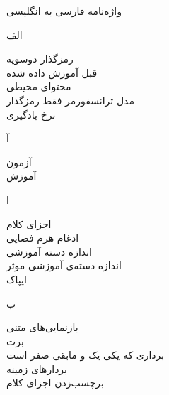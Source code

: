 

\begin{center}
\vspace{1.5cm}
\Huge{واژه‌نامه فارسی به انگلیسی}
\vspace{1.5cm}
\end{center}
\begin{center}
الف
\end{center}

\begin{center}
 
\end{center}
 رمزگذار دوسویه	 \dotfill 	 {} \\ 
 قبل آموزش داده‌ شده	 \dotfill 	 {} \\ 
 محتوای محیطی	 \dotfill 	 {} \\ 
 مدل ترانسفورمر فقط رمزگذار	 \dotfill 	 {} \\ 
 نرخ یادگیری	 \dotfill 	 {} \\ 
\begin{center}
آ
\end{center}
آزمون	 \dotfill 	 {} \\ 
آموزش	 \dotfill 	 {} \\ 
\begin{center}
ا
\end{center}
اجزای کلام	 \dotfill 	 {} \\ 
ادغام هرم فضایی	 \dotfill 	 {} \\ 
اندازه دسته آموزشی	 \dotfill 	 {} \\ 
اندازه دسته‌ی آموزشی موثر	 \dotfill 	 {} \\ 
ایپاک	 \dotfill 	 {} \\ 
\begin{center}
ب
\end{center}
بازنمایی‌های متنی	 \dotfill 	 {} \\ 
برت	 \dotfill 	 {} \\ 
برداری که یکی یک و مابقی صفر است	 \dotfill 	 {} \\ 
بردار‌های زمینه	 \dotfill 	 {} \\ 
برچسب‌زدن اجزای کلام	 \dotfill 	 {} \\ 
